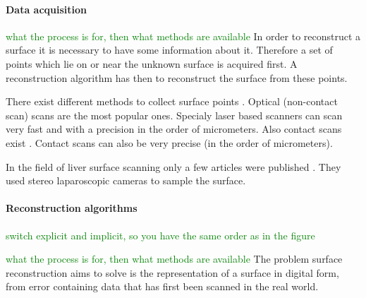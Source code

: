 \paragraph{Data acquisition}
\textcolor{green}{what the process is for, then what methods are available}
In order to reconstruct a surface it is necessary to have some information about
it. Therefore a set of points which lie on or near the unknown surface is acquired first. A
reconstruction algorithm has then to reconstruct the surface from these points.

There exist different methods to collect surface points
\cite{franca20053d}\cite{levoy2000digital}\cite{cui20113d}\cite{chu2002infrared}\cite{dou20153d}.
Optical (non-contact scan) scans are the most popular ones. Specialy laser based
scanners can scan very fast and with a precision in the order of micrometers. Also contact scans exist
\cite{pai2001scanning}. Contact scans can also be very precise (in the order of
micrometers).

In the field of liver surface scanning only a few articles were published  \cite{maier2014comparative} \cite{thompson2015accuracy}. 
They used stereo laparoscopic cameras to sample the surface.

\paragraph{Reconstruction algorithms}
\textcolor{green}{ switch explicit and implicit, so you have the same order as in the figure}

\textcolor{green}{what the process is for, then what methods are available}
The problem
surface reconstruction aims to solve is the representation of a surface in 
digital form, from error containing data that has first been scanned in the
real world.

